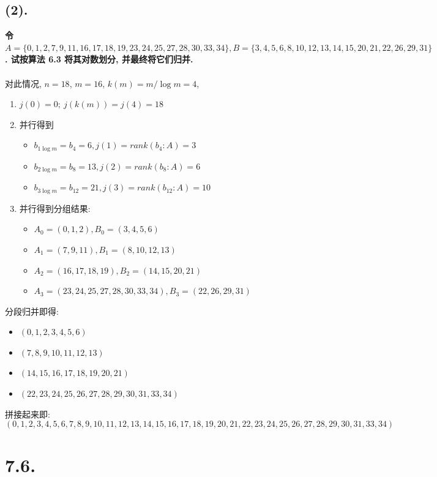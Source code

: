 \documentclass[UTF8]{article}
\newcommand{\jumpLine} {\hspace*{\fill} \\}
\begin{document}
\subsection*{(2).}
\noindent \textbf{
令 $A=\{0,1,2,7,9,11,16,17,18,19,23,24,25,27,28,30,33,34\}, B=\{3,4,5,6,8,10,12,13,14,15,20,21,22,26,29,31\}$. 试按算法 6.3 将其对数划分, 并最终将它们归并.} \\ \jumpLine\noindent
对此情况, $n=18$, $m=16$, $k(m)=m/\log m=4$,
\begin{enumerate}[(1).]
	\item $j(0)=0;\ j(k(m))=j(4)=18$
	\item 并行得到 
		\begin{itemize}
			\item $b_{1\log m}=b_{4}=6, j(1)=rank(b_4: A)=3$
			\item $b_{2\log m}=b_{8}=13, j(2)=rank(b_8: A)=6$
			\item $b_{3\log m}=b_{12}=21, j(3)=rank(b_{12}: A)=10$
		\end{itemize}
	\item 并行得到分组结果:
		\begin{itemize}
			\item $A_0=(0,1,2), B_0=(3,4,5,6)$
			\item $A_1=(7,9,11), B_1=(8,10,12,13)$
			\item $A_2=(16,17,18,19), B_2=(14,15,20,21)$
			\item $A_3=(23,24,25,27,28,30,33,34), B_3=(22,26,29,31)$
		\end{itemize}
\end{enumerate}
分段归并即得:
\begin{itemize}
	\item $(0,1,2,3,4,5,6)$
	\item $(7,8,9,10,11,12,13)$
	\item $(14,15,16,17,18,19,20,21)$
	\item $(22,23,24,25,26,27,28,29,30,31,33,34)$
\end{itemize}
拼接起来即:
$$(0,1,2,3,4,5,6,7,8,9,10,11,12,13,14,15,16,17,18,19,20,21,22,23,24,25,26,27,28,29,30,31,33,34)$$

\section*{7.6.}
\end{document}
